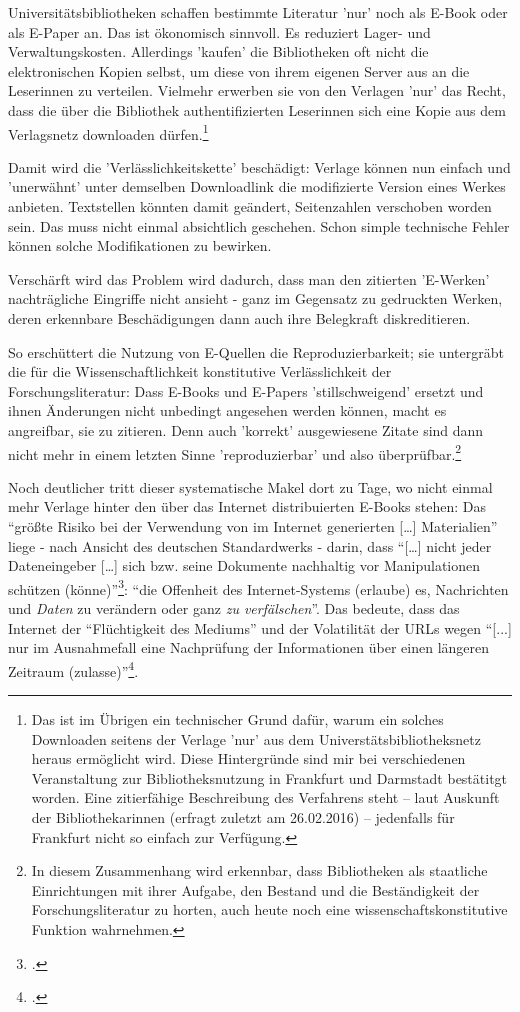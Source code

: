 Universitätsbibliotheken schaffen bestimmte Literatur 'nur' noch als E-Book oder als E-Paper an. Das ist ökonomisch sinnvoll. Es reduziert Lager- und Verwaltungskosten. Allerdings 'kaufen' die Bibliotheken oft nicht die elektronischen Kopien selbst, um diese von ihrem eigenen Server aus an die Leserinnen zu verteilen. Vielmehr erwerben sie von den Verlagen 'nur' das Recht, dass die über die Bibliothek authentifizierten Leserinnen sich eine Kopie aus dem Verlagsnetz downloaden dürfen.\footnote{Das ist im Übrigen ein technischer Grund dafür, warum ein solches Downloaden seitens der Verlage 'nur' aus dem Universtätsbibliotheksnetz heraus ermöglicht wird. Diese Hintergründe sind mir bei verschiedenen Veranstaltung zur Bibliotheksnutzung in Frankfurt und Darmstadt bestätitgt worden. Eine zitierfähige Beschreibung des Verfahrens steht -- laut Auskunft der Bibliothekarinnen (erfragt zuletzt am 26.02.2016) -- jedenfalls für Frankfurt nicht so einfach zur Verfügung.}

Damit wird die 'Verlässlichkeitskette' beschädigt: Verlage können nun einfach und 'unerwähnt' unter demselben Downloadlink die modifizierte Version eines Werkes anbieten. Textstellen könnten damit geändert, Seitenzahlen verschoben worden sein. Das muss nicht einmal absichtlich geschehen. Schon simple technische Fehler können solche Modifikationen zu bewirken.

Verschärft wird das Problem wird dadurch, dass man den zitierten 'E-Werken' nachträgliche Eingriffe nicht ansieht - ganz im Gegensatz zu gedruckten Werken, deren erkennbare Beschädigungen dann auch ihre Belegkraft diskreditieren.

So erschüttert die Nutzung von E-Quellen die Reproduzierbarkeit; sie untergräbt die für die Wissenschaftlichkeit konstitutive Verlässlichkeit der Forschungsliteratur: Dass E-Books und E-Papers 'stillschweigend' ersetzt und ihnen Änderungen nicht unbedingt angesehen werden können, macht es angreifbar, sie zu zitieren. Denn auch 'korrekt' ausgewiesene Zitate sind dann nicht mehr in einem letzten Sinne 'reproduzierbar' und also überprüfbar.\footnote{In diesem Zusammenhang wird erkennbar, dass Bibliotheken als staatliche Einrichtungen mit ihrer Aufgabe, den Bestand und die Beständigkeit der Forschungsliteratur zu horten, auch heute noch eine wissenschaftskonstitutive Funktion wahrnehmen.}

Noch deutlicher tritt dieser systematische Makel dort zu Tage, wo nicht einmal mehr Verlage hinter den über das Internet distribuierten E-Books stehen: Das \enquote{größte Risiko bei der Verwendung von im Internet generierten [\ldots] Materialien} liege - nach Ansicht des deutschen Standardwerks - darin, dass \enquote{[\ldots] nicht jeder Dateneingeber [\ldots] sich bzw. seine Dokumente nachhaltig vor Manipulationen schützen (könne)}\footcite[vgl.][85]{Theisen2013a}: \enquote{die Offenheit des Internet-Systems (erlaube) es, Nachrichten und \emph{Daten} zu verändern oder ganz \emph{zu verfälschen}}. Das bedeute, dass das Internet der \enquote{Flüchtigkeit des Mediums} und der Volatilität der URLs wegen \enquote{[...] nur im Ausnahmefall eine Nachprüfung der Informationen über einen längeren Zeitraum (zulasse)}\footcite[vgl.][S. 86f (herv.i.O)]{Theisen2013a}.

